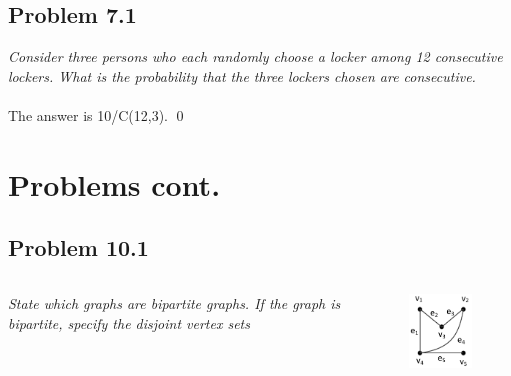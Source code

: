 \documentclass[
        ]{beamer}
\begin{document}
    \subsection{Problem 7.1}
        \begin{frame}[c]{\subsecname}
            \emph{Consider three persons who each randomly choose a locker among 12 consecutive
lockers. What is the probability that the three lockers chosen are consecutive.}\\$\;$\\\pause
            The answer is 10/C(12,3). \qed
        \end{frame}


\section{Problems cont.}
    \subsection{Problem 10.1}
        \begin{frame}[c]{\subsecname}
            \begin{columns}
                \emph{State which graphs are bipartite graphs. If the graph is bipartite, specify the disjoint vertex sets}\\$\;$\\
            \column{28.6mm}
                \begin{figure}
                    \centering
                    \includegraphics[width=28.6mm]{tut11p10}
                \end{figure}
            \end{columns}
        \end{frame}
        
        
\end{document}
